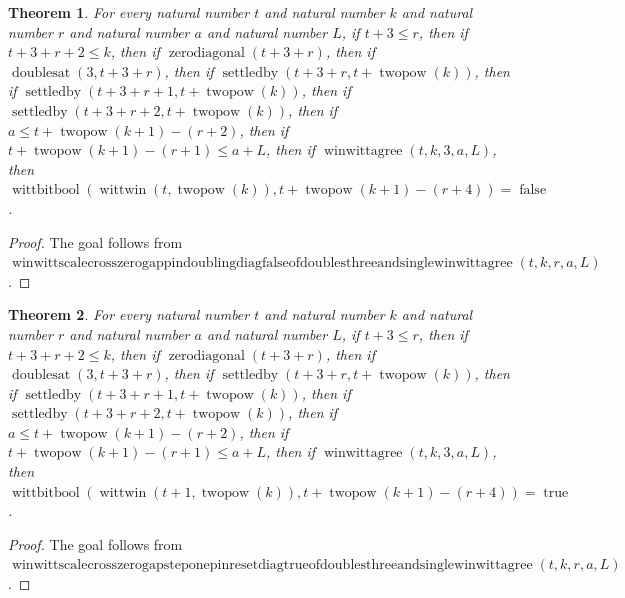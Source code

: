 \documentclass[11pt]{article}
\newtheorem{theorem}{Theorem}[section]
\theoremstyle{definition}
\begin{document}
\begin{theorem}
\label{ll:paper:winwitt-scale-cross-zero-gap-pin-doubling-diag-false-of-doubles-three-and-single-winwittagree}
For every natural number \(t\) and natural number \(k\) and natural number \(r\) and natural number \(a\) and natural number \(L\), if \(t + 3 \le r\), then if \(t + 3 + r + 2 \le k\), then if \(\operatorname{zerodiagonal}(t + 3 + r)\), then if \(\operatorname{doublesat}(3, t + 3 + r)\), then if \(\operatorname{settledby}(t + 3 + r, t + \operatorname{twopow}(k))\), then if \(\operatorname{settledby}(t + 3 + r + 1, t + \operatorname{twopow}(k))\), then if \(\operatorname{settledby}(t + 3 + r + 2, t + \operatorname{twopow}(k))\), then if \(a \le t + \operatorname{twopow}(k + 1) - (r + 2)\), then if \(t + \operatorname{twopow}(k + 1) - (r + 1) \le a + L\), then if \(\operatorname{winwittagree}(t, k, 3, a, L)\), then \(\operatorname{wittbitbool}(\operatorname{wittwin}(t, \operatorname{twopow}(k)), t + \operatorname{twopow}(k + 1) - (r + 4)) = \operatorname{false}\).
\end{theorem}
\begin{proof}
The goal follows from \(\operatorname{winwittscalecrosszerogappindoublingdiagfalseofdoublesthreeandsinglewinwittagree}(t, k, r, a, L)\).
\end{proof}
\begin{theorem}
\label{ll:paper:winwitt-scale-cross-zero-gap-step-one-pin-reset-diag-true-of-doubles-three-and-single-winwittagree}
For every natural number \(t\) and natural number \(k\) and natural number \(r\) and natural number \(a\) and natural number \(L\), if \(t + 3 \le r\), then if \(t + 3 + r + 2 \le k\), then if \(\operatorname{zerodiagonal}(t + 3 + r)\), then if \(\operatorname{doublesat}(3, t + 3 + r)\), then if \(\operatorname{settledby}(t + 3 + r, t + \operatorname{twopow}(k))\), then if \(\operatorname{settledby}(t + 3 + r + 1, t + \operatorname{twopow}(k))\), then if \(\operatorname{settledby}(t + 3 + r + 2, t + \operatorname{twopow}(k))\), then if \(a \le t + \operatorname{twopow}(k + 1) - (r + 2)\), then if \(t + \operatorname{twopow}(k + 1) - (r + 1) \le a + L\), then if \(\operatorname{winwittagree}(t, k, 3, a, L)\), then \(\operatorname{wittbitbool}(\operatorname{wittwin}(t + 1, \operatorname{twopow}(k)), t + \operatorname{twopow}(k + 1) - (r + 4)) = \operatorname{true}\).
\end{theorem}
\begin{proof}
The goal follows from \(\operatorname{winwittscalecrosszerogapsteponepinresetdiagtrueofdoublesthreeandsinglewinwittagree}(t, k, r, a, L)\).
\end{proof}
\end{document}
